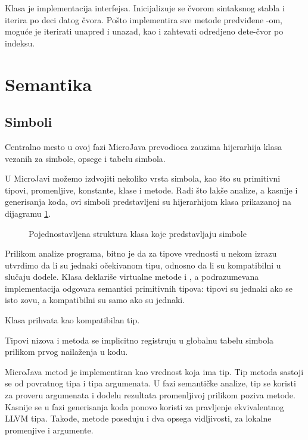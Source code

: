 Klasa  je implementacija  interfejsa.
Inicijalizuje se čvorom sintaksnog stabla i iterira po deci datog čvora. 
Pošto implementira sve metode predviđene -om, moguće je iterirati unapred i unazad, kao i zahtevati odredjeno dete-čvor po indeksu.

\section{Semantika}

\subsection*{Simboli}

Centralno mesto u ovoj fazi MicroJava prevodioca zauzima hijerarhija klasa vezanih za simbole, opsege i tabelu simbola.

U MicroJavi možemo izdvojiti nekoliko vrsta simbola, kao što su primitivni tipovi, promenljive, konstante, klase i metode.
Radi što lakše analize, a kasnije i generisanja koda, ovi simboli predstavljeni su hijerarhijom klasa prikazanoj na dijagramu \ref{fig:symbols}.

\begin{figure}[h]
	\centering
	
	\caption{Pojednostavljena struktura klasa koje predstavljaju simbole}
	\label{fig:symbols}
\end{figure}

Prilikom analize programa, bitno je da za tipove vrednosti u nekom izrazu utvrdimo da li su jednaki očekivanom tipu, odnosno da li su kompatibilni u slučaju dodele.
Klasa  deklariše virtualne metode  i , a podrazumevana implementacija odgovara semantici primitivnih tipova: tipovi su jednaki ako se isto zovu, a kompatibilni su samo ako su jednaki.

Klasa  prihvata  kao kompatibilan tip.

Tipovi nizova i metoda se implicitno registruju u globalnu tabelu simbola prilikom prvog nailaženja u kodu.

MicroJava metod je implementiran kao vrednost koja ima tip.
Tip metoda sastoji se od povratnog tipa i tipa argumenata. 
U fazi semantičke analize, tip se koristi za proveru argumenata i dodelu rezultata promenljivoj prilikom poziva metode.
Kasnije se u fazi generisanja koda ponovo koristi za pravljenje ekvivalentnog LLVM tipa.
Takođe, metode poseduju i dva opsega vidljivosti, za lokalne promenjive i argumente.

